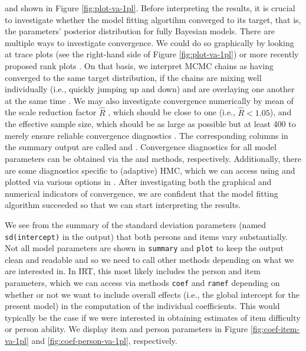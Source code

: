 \documentclass[jss]{jss}
\begin{document}
and shown in Figure \ref{fig:plot-va-1pl}. Before interpreting the
results, it is crucial to investigate whether the model fitting
algortihm converged to its target, that is, the parameters' posterior
distribution for fully Bayesian models. There are multiple ways to
investigate convergence. We could do so graphically by looking at trace
plots (see the right-hand side of Figure \ref{fig:plot-va-1pl}) or more
recently proposed rank plots \citep{vehtari2019}. On that basis, we
interpret MCMC chains as having converged to the same target
distribution, if the chains are mixing well individually (i.e., quickly
jumping up and down) and are overlaying one another at the same time
\citep{gelman2013}. We may also investigate convergence numerically by
mean of the scale reduction factor \(\widehat{R}\)
\citep{gelman1992, gelman2013, vehtari2019}, which should be close to
one (i.e., \(\widehat{R} < 1.05\)), and the effective sample size, which
should be as large as possible but at least 400 to merely ensure
reliable convergence diagnostics \citep{vehtari2019}. The corresponding
columns in the summary output are called  and
. Convergence diagnostics for all model parameters can
be obtained via the  and  methods,
respectively. Additionally, there are some diagnostics specific to
(adaptive) HMC, which we can access using  and plotted
via various options in . After investigating both the
graphical and numerical indicators of convergence, we are confident that
the model fitting algorithm succeeded so that we can start interpreting
the results.

We see from the summary of the standard deviation parameters (named
\texttt{sd(intercept)} in the output) that both persons and items vary
substantially. Not all model parameters are shown in \texttt{summary}
and \texttt{plot} to keep the output clean and readable and so we need
to call other methods depending on what we are interested in. In IRT,
this most likely includes the person and item parameters, which we can
access via methods \texttt{coef} and \texttt{ranef} depending on whether
or not we want to include overall effects (i.e., the global intercept
for the present model) in the computation of the individual
coefficients. This would typically be the case if we were interested in
obtaining estimates of item difficulty or person ability. We display
item and person parameters in Figure \ref{fig:coef-item-va-1pl} and
\ref{fig:coef-person-va-1pl}, respectively.
\end{document}
